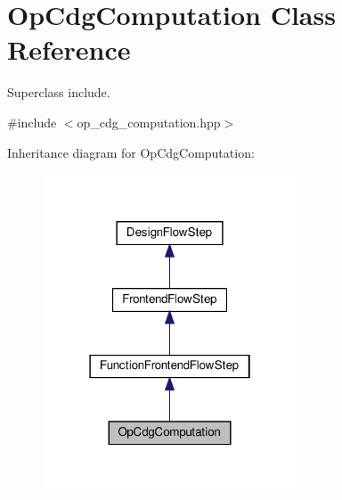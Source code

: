 \hypertarget{classOpCdgComputation}{}\section{Op\+Cdg\+Computation Class Reference}
\label{classOpCdgComputation}


Superclass include.  




{\ttfamily \#include $<$op\+\_\+cdg\+\_\+computation.\+hpp$>$}



Inheritance diagram for Op\+Cdg\+Computation\+:
\nopagebreak
\begin{figure}[H]
\begin{center}
\leavevmode
\includegraphics[width=214pt]{d8/d9e/classOpCdgComputation__inherit__graph}
\end{center}
\end{figure}


